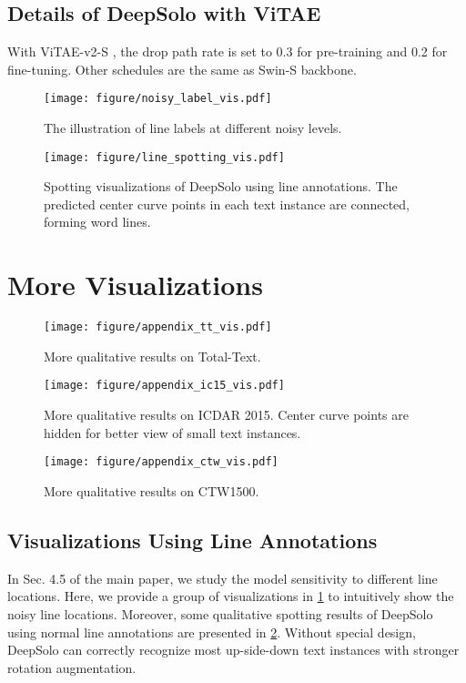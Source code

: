 \documentclass[10pt,twocolumn,letterpaper]{article}
\begin{document}
\begin{table}[!t]
\subsection{Details of DeepSolo with ViTAE}
With ViTAE-v2-S \cite{zhang2022vitaev2}, the drop path rate is set to 0.3 for pre-training and 0.2 for fine-tuning. Other schedules are the same as Swin-S backbone.

\begin{figure}[!t]
    \centering
    \texttt{[image: figure/noisy\_label\_vis.pdf]}
    \caption{The illustration of line labels at different noisy levels.}
    \label{fig:noisy_label_vis}
\end{figure}

\begin{figure}[!t]
    \centering
    \texttt{[image: figure/line\_spotting\_vis.pdf]}
    \caption{Spotting visualizations of DeepSolo using line annotations. The predicted center curve points in each text instance are connected, forming word lines.}
    \label{fig:line_spotting_vis}
\end{figure}

\section{More Visualizations}
\label{sec:vis}

\begin{figure*}[!t]
    \centering
    \texttt{[image: figure/appendix\_tt\_vis.pdf]}
    \caption{More qualitative results on Total-Text.}
    \label{fig:tt_vis}
\end{figure*}

\begin{figure*}[!t]
    \centering
    \texttt{[image: figure/appendix\_ic15\_vis.pdf]}
    \caption{More qualitative results on ICDAR 2015. Center curve points are hidden for better view of small text instances.}
    \label{fig:ic15_vis}
\end{figure*}

\begin{figure*}[!t]
    \centering
    \texttt{[image: figure/appendix\_ctw\_vis.pdf]}
    \caption{More qualitative results on CTW1500.}
    \label{fig:ctw_vis}
\end{figure*}

\subsection{Visualizations Using Line Annotations}
In Sec. 4.5 of the main paper, we study the model sensitivity to different line locations. Here, we provide a group of visualizations in \cref{fig:noisy_label_vis} to intuitively show the noisy line locations. Moreover, some qualitative spotting results of DeepSolo using normal line annotations are presented in \cref{fig:line_spotting_vis}. Without special design, DeepSolo can correctly recognize most up-side-down text instances with stronger rotation augmentation.


\end{table}
\end{document}
